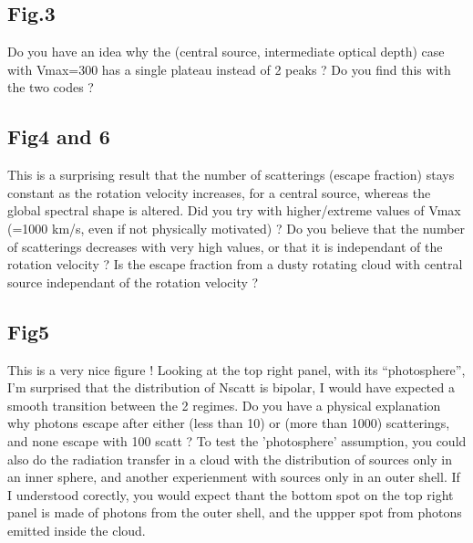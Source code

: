 \documentclass[12pt]{article}
\begin{document}
\subsection*{Fig.3}

Do you have an idea why the (central source, intermediate optical depth) case with Vmax=300 has a single plateau instead of 2 peaks ? Do you find this with the two codes ?


\subsection*{Fig4 and 6}

This is a surprising result that the number of scatterings (escape fraction) stays constant as the rotation velocity increases, for a central source, whereas the global spectral shape is altered. Did you try with higher/extreme values of Vmax (=1000 km/s, even if not physically motivated) ? Do you believe that the number of scatterings decreases with very high values, or that it is independant of the rotation velocity ? Is the escape fraction from a dusty rotating cloud with central source independant of the rotation velocity ?

\subsection*{Fig5}
This is a very nice figure ! Looking at the top right panel, with its “photosphere”, I’m surprised that the distribution of Nscatt is bipolar, I would have expected a smooth transition between the 2 regimes. Do you have a physical explanation why photons escape after either (less than 10) or (more than 1000) scatterings, and none escape with 100 scatt ? To test the ’photosphere’ assumption, you could also do the radiation transfer in a cloud with the distribution of sources only in an inner sphere, and another experienment with sources only in an outer shell. If I understood corectly, you would expect thant the bottom spot on the top right panel is made of photons from the outer shell, and the uppper spot from photons emitted inside the cloud.
\end{document}
